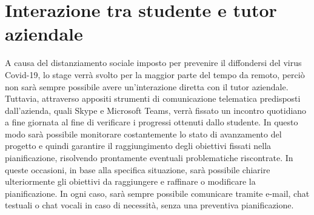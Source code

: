 
\section{Interazione tra studente e tutor aziendale}
	A causa del distanziamento sociale imposto per prevenire il diffondersi del virus Covid-19, lo stage verrà svolto per la maggior parte del tempo da remoto, perciò non sarà sempre possibile avere un'interazione diretta con il tutor aziendale.
	\newline
	Tuttavia, attraverso appositi strumenti di comunicazione telematica predisposti dall'azienda, quali Skype e Microsoft Teams, verrà fissato un incontro quotidiano a fine giornata al fine di verificare i progressi ottenuti dallo studente. In questo modo sarà possibile monitorare costantemente lo stato di avanzamento del progetto e quindi garantire il raggiungimento degli obiettivi fissati nella pianificazione, risolvendo prontamente eventuali problematiche riscontrate. 
	\newline
	In queste occasioni, in base alla specifica situazione, sarà possibile chiarire ulteriormente gli obiettivi da raggiungere e raffinare o modificare la pianificazione.
	\newline
	In ogni caso, sarà sempre possibile comunicare tramite e-mail, chat testuali o chat vocali in caso di necessità, senza una preventiva pianificazione.
	
